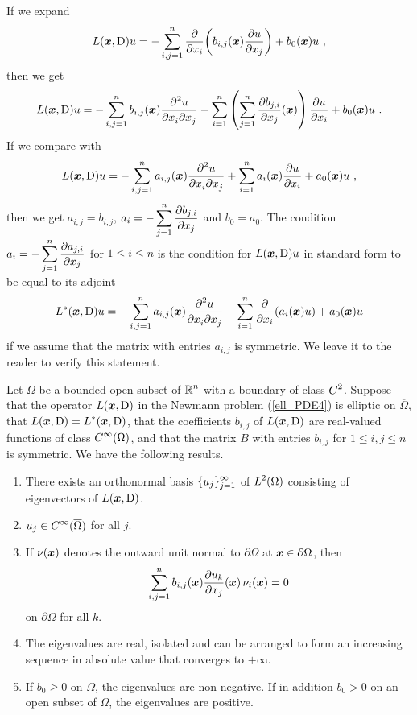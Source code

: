 \begin{rmk}
If we expand
\[
L(\VEC{x}, \diff)u = -\sum_{i,j=1}^n
\pdfdx{\left( b_{i,j}(\VEC{x}) \pdydx{u}{x_j} \right)}{x_i} + b_0(\VEC{x})u \ ,
\]
then we get
\[
L(\VEC{x}, \diff)u = -\sum_{i,j=1}^n b_{i,j}(\VEC{x})
\pdydxnm{u}{x_i}{x_j}{2}{}{}
- \sum_{i=1}^n \left( \sum_{j=1}^n \pdydx{b_{j,i}}{x_j}(\VEC{x}) \right)
\pdydx{u}{x_i} + b_0(\VEC{x})u \ .
\]
If we compare with
\[
L(\VEC{x}, \diff)u = -\sum_{i,j=1}^n a_{i,j}(\VEC{x})
\pdydxnm{u}{x_i}{x_j}{2}{}{}
+ \sum_{i=1}^n a_i(\VEC{x}) \pdydx{u}{x_i} + a_0(\VEC{x})u \ ,
\]
then we get $a_{i,j} = b_{i,j}$, 
$\DS a_i = - \sum_{j=1}^n \pdydx{b_{j,i}}{x_j}$ and
$b_0 = a_0$.  The condition
$\DS a_i = - \sum_{j=1}^n \pdydx{a_{j,i}}{x_j}$ for
$1 \leq i \leq n$ is the condition for $L(\VEC{x}, \diff)u$ in
standard form to be equal to its adjoint
\[
L^\ast(\VEC{x}, \diff)u = -\sum_{i,j=1}^n a_{i,j}(\VEC{x})
\pdydxnm{u}{x_i}{x_j}{2}{}{}
- \sum_{i=1}^n \pdfdx{\left( a_i(\VEC{x}) u\right)}{x_i} +
a_0(\VEC{x})u
\]
if we assume that the matrix with entries $a_{i,j}$ is symmetric.  We
leave it to the reader to verify this statement.
\end{rmk}

\begin{theorem} \label{ell_exist_th5}
Let $\Omega$ be a bounded open subset of $\DS \RR^n$ with a boundary
of class $\DS C^2$.
Suppose that the operator $L(\VEC{x},\diff)$ in the Newmann problem
(\ref{ell_PDE4}) is elliptic on $\overline{\Omega}$, that
$\DS L(\VEC{x},\diff)=L^\ast(\VEC{x},\diff)$, that the
coefficients $b_{i,j}$ of $L(\VEC{x},\diff)$ are real-valued
functions of class $\DS C^\infty(\Omega)$, and that the \nn
matrix $B$ with entries
$b_{i,j}$ for $1\leq i,j\leq n$ is symmetric.  We have the following results.
\begin{enumerate}
\item There exists an orthonormal basis $\DS \{u_j\}_{j=1}^\infty$ of
$\DS L^2(\Omega)$ consisting of eigenvectors of $L(\VEC{x},\diff)$.
\item $\DS u_j \in C^\infty(\overline{\Omega})$ for all $j$.
\item If $\nu(\VEC{x})$ denotes the outward unit normal to
$\partial \Omega$ at $\VEC{x} \in \partial \Omega$, then
\[
\sum_{i,j=1}^n b_{i,j}(\VEC{x}) \pdydx{u_k}{x_j}(\VEC{x})\,\nu_i(\VEC{x})= 0
\]
on $\partial \Omega$ for all $k$.
\item The eigenvalues are real, isolated and can be arranged to form an
increasing sequence in absolute value that converges to $+\infty$.
\item If $b_0\geq 0$ on $\Omega$, the eigenvalues are non-negative.
If in addition $b_0>0$ on an open subset of $\Omega$, the eigenvalues
are positive.
\end{enumerate}
\end{theorem}


